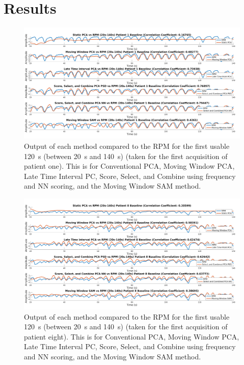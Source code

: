 \section{Results} \label{sec:results}
    \begin{figure}
        \centering
        
        \includegraphics[width=1.0\linewidth]{patient_one_baseline_output.png}
        
        \captionsetup{singlelinecheck=false}
        \caption{Output of each method compared to the \gls{RPM} for the first usable \SI{120}{\second} (between \SI{20}{\second} and \SI{140}{\second}) (taken for the first acquisition of patient one). This is for Conventional \gls{PCA}, Moving Window \gls{PCA}, Late Time Interval \gls{PC}, Score, Select, and Combine using frequency and \gls{NN} scoring, and the Moving Window \gls{SAM} method.}
        \label{fig:patient_one_baseline_output}
    \end{figure}
    
    \begin{figure}
        \centering
        
        \includegraphics[width=1.0\linewidth]{patient_eight_baseline_output.png}
        
        \captionsetup{singlelinecheck=false}
        \caption{Output of each method compared to the \gls{RPM} for the first usable \SI{120}{\second} (between \SI{20}{\second} and \SI{140}{\second}) (taken for the first acquisition of patient eight). This is for Conventional \gls{PCA}, Moving Window \gls{PCA}, Late Time Interval \gls{PC}, Score, Select, and Combine using frequency and \gls{NN} scoring, and the Moving Window \gls{SAM} method.}
        \label{fig:patient_eight_baseline_output}
    \end{figure}

